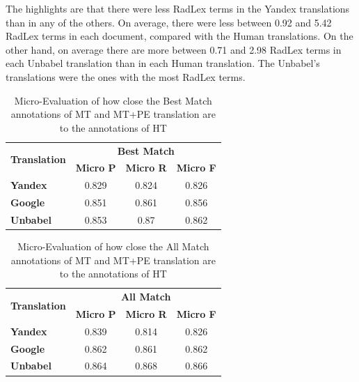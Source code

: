 The highlights are that there were less RadLex terms in the Yandex translations than in any of the others. On average, there were less between 0.92 and 5.42 RadLex terms in each document, compared with the Human translations. On the other hand, on average there are more between 0.71 and 2.98 RadLex terms in each Unbabel translation than in each Human translation. The Unbabel's translations were the ones with the most RadLex terms. 

\begin{table}[!htp]
\centering
\begin{tabular}{@{}lccc@{}}
\toprule
\multicolumn{1}{c}{\multirow{2}{*}{\textbf{Translation}}} & \multicolumn{3}{c}{\textbf{Best Match}}                            \\ \cmidrule(l){2-4}
\multicolumn{1}{c}{}          & \textbf{Micro P}     & \textbf{Micro R}      & \textbf{Micro F}          \\ \midrule
\textbf{Yandex}   & 0.829                & 0.824                 & 0.826                   \\ 

\textbf{Google}   & 0.851                & 0.861                 & 0.856                   \\ 

\textbf{Unbabel}  & 0.853                & 0.87                 & 0.862         \\ \bottomrule 

\end{tabular}%
\caption{Micro-Evaluation of how close the Best Match annotations of MT and MT+PE translation are to the annotations of HT}
\label{table: Results Best Match Micro}
\end{table}


\begin{table}[!htp]
\centering
\begin{tabular}{@{}lccc@{}}
\toprule
\multicolumn{1}{c}{\multirow{2}{*}{\textbf{Translation}}} & \multicolumn{3}{c}{\textbf{All Match}}                            \\ \cmidrule(l){2-4}
\multicolumn{1}{c}{}          & \textbf{Micro P}     & \textbf{Micro R}      & \textbf{Micro F}          \\ \midrule
\textbf{Yandex}   & 0.839                & 0.814                 & 0.826                   \\ 

\textbf{Google}   & 0.862                & 0.861                 & 0.862                   \\ 

\textbf{Unbabel}  & 0.864                & 0.868                 & 0.866         \\ \bottomrule 

\end{tabular}%
\caption{Micro-Evaluation of how close the All Match annotations of MT and MT+PE translation are to the annotations of HT}
\label{table: Results All Match Micro}
\end{table}


